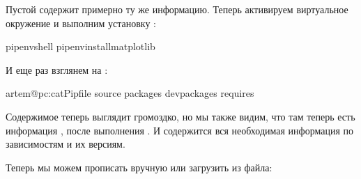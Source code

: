 \documentclass[letterpaper,10pt,russian]{sphinxmanual}
\begin{document}
\sphinxAtStartPar
Пустой  содержит примерно ту же информацию. Теперь активируем виртуальное окружение и выполним установку :

\begin{sphinxVerbatim}[commandchars=\\\{\}]
pipenvshell
pipenvinstallmatplotlib
\end{sphinxVerbatim}

\sphinxAtStartPar
И еще раз взглянем на :

\begin{sphinxVerbatim}[commandchars=\\\{\}]
artem@pc:\PYGZti{}\PYGZdl{}catPipfile
\PYG{o}{[}\PYG{o}{[}source\PYG{o}{]}\PYG{o}{]}
\PYG{o}{[}packages\PYG{o}{]}
\PYG{o}{[}dev\PYGZhy{}packages\PYG{o}{]}
\PYG{o}{[}requires\PYG{o}{]}
\end{sphinxVerbatim}

\sphinxAtStartPar
Содержимое  теперь выглядит громоздко, но мы также видим, что там теперь есть информация , после выполнения . И содержится вся необходимая информация по зависимостям и их версиям.

\sphinxAtStartPar
Теперь мы можем прописать  вручную или загрузить из файла:
\end{document}
